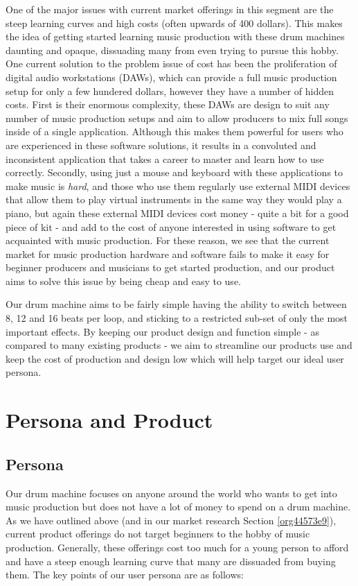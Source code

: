\documentclass[11pt]{article}
\begin{document}
One of the major issues with current market offerings in this segment
are the steep learning curves and high costs (often upwards of 400
dollars). This makes the idea of getting started learning music
production with these drum machines daunting and opaque, dissuading
many from even trying to pursue this hobby. One current solution to
the problem issue of cost has been the proliferation of digital audio
workstations (DAWs), which can provide a full music production setup
for only a few hundered dollars, however they have a number of hidden
costs. First is their enormous complexity, these DAWs are design to
suit any number of music production setups and aim to allow producers
to mix full songs inside of a single application. Although this makes
them powerful for users who are experienced in these software
solutions, it results in a convoluted and inconsistent application
that takes a career to master and learn how to use
correctly. Secondly, using just a mouse and keyboard with these
applications to make music is \emph{hard}, and those who use them regularly
use external MIDI devices that allow them to play virtual instruments
in the same way they would play a piano, but again these external MIDI
devices cost money - quite a bit for a good piece of kit - and add to
the cost of anyone interested in using software to get acquainted with
music production. For these reason, we see that the current market for
music production hardware and software fails to make it easy for
beginner producers and musicians to get started production, and our
product aims to solve this issue by being cheap and easy to use.

Our drum machine aims to be fairly simple having the ability to switch
between 8, 12 and 16 beats per loop, and sticking to a restricted
sub-set of only the most important effects. By keeping our product
design and function simple - as compared to many existing products -
we aim to streamline our products use and keep the cost of production
and design low which will help target our ideal user persona.

\section{Persona and Product}
\label{sec:org2c3e213}
\subsection{Persona}
\label{sec:orgdf33ceb}

Our drum machine focuses on anyone around the world who wants to get
into music production but does not have a lot of money to spend on a
drum machine. As we have outlined above (and in our market research
Section \ref{org44573e9}), current product offerings do not target beginners
to the hobby of music production. Generally, these offerings cost too
much for a young person to afford and have a steep enough learning
curve that many are dissuaded from buying them. The key points of
our user persona are as follows:
\end{document}
